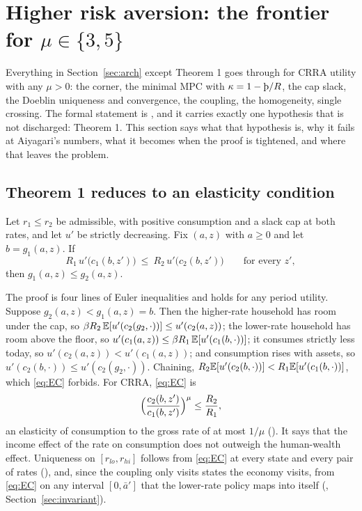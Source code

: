 \section{Higher risk aversion: the frontier for \texorpdfstring{$\mu\in\{3,5\}$}{mu = 3, 5}}
\label{sec:beyond}

Everything in Section~\ref{sec:arch} except Theorem 1 goes through for CRRA utility with any
$\mu>0$: the corner, the minimal MPC with $\kappa=1-\Thorn/R$, the cap slack, the Doeblin
uniqueness and convergence, the coupling, the homogeneity, single crossing. The formal statement is
, and it carries exactly one hypothesis that is
not discharged: Theorem 1. This section says what that hypothesis is, why it fails at Aiyagari's
numbers, what it becomes when the proof is tightened, and where that leaves the problem.

\subsection{Theorem 1 reduces to an elasticity condition}\label{sec:elasticity}

\begin{proposition}\label{prop:elas}
Let $r_1\le r_2$ be admissible, with positive consumption and a slack cap at both rates, and let
$u'$ be strictly decreasing. Fix $(a,z)$ with $a\ge0$ and let $b=g_1(a,z)$. If
\begin{equation}\label{eq:EC}
  R_1\,u'\bigl(c_1(b,z')\bigr)\ \le\ R_2\,u'\bigl(c_2(b,z')\bigr)\qquad\text{for every }z',
\end{equation}
then $g_1(a,z)\le g_2(a,z)$.
\end{proposition}

The proof is four lines of Euler inequalities and holds for any period utility. Suppose
$g_2(a,z)<g_1(a,z)=b$. Then the higher-rate household has room under the cap, so
$\beta R_2\,\mathbb{E}[u'(c_2(g_2,\cdot))]\le u'(c_2(a,z))$; the lower-rate household has room above the
floor, so $u'(c_1(a,z))\le\beta R_1\,\mathbb{E}[u'(c_1(b,\cdot))]$; it consumes strictly less today, so
$u'(c_2(a,z))<u'(c_1(a,z))$; and consumption rises with assets, so
$u'(c_2(b,\cdot))\le u'(c_2(g_2,\cdot))$. Chaining, $R_2\mathbb{E}[u'(c_2(b,\cdot))]<R_1\mathbb{E}[u'(c_1(b,\cdot))]$,
which \eqref{eq:EC} forbids. For CRRA, \eqref{eq:EC} is
\[
  \Bigl(\frac{c_2(b,z')}{c_1(b,z')}\Bigr)^{\mu}\le\frac{R_2}{R_1},
\]
an elasticity of consumption to the gross rate of at most $1/\mu$ ().
It says that the income effect of the rate on consumption does not outweigh the human-wealth
effect. Uniqueness on $[r_{lo},r_{hi}]$ follows from \eqref{eq:EC} at every state and every pair of
rates (), and, since the coupling only visits
states the economy visits, from \eqref{eq:EC} on any interval $[0,\bar a']$ that the lower-rate
policy maps into itself (,
Section~\ref{sec:invariant}).


